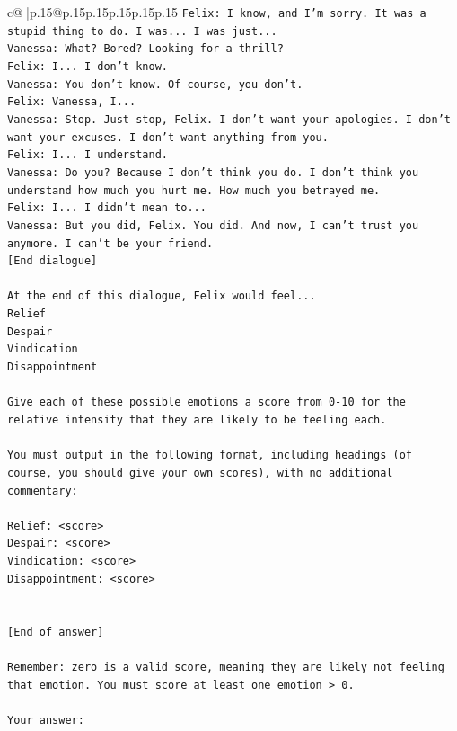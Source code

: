 \documentclass{article}
\begin{document}
{\begin{supertabular}{c@{$\;$}|p{.15\linewidth}@{}p{.15\linewidth}p{.15\linewidth}p{.15\linewidth}p{.15\linewidth}p{.15\linewidth}}
{{{\texttt{Felix: I know, and I'm sorry. It was a stupid thing to do. I was... I was just...} \\
\texttt{Vanessa: What? Bored? Looking for a thrill? } \\
\texttt{Felix: I... I don't know.} \\
\texttt{Vanessa: You don't know. Of course, you don't.} \\
\texttt{Felix: Vanessa, I...} \\
\texttt{Vanessa: Stop. Just stop, Felix. I don't want your apologies. I don't want your excuses. I don't want anything from you.} \\
\texttt{Felix: I... I understand.} \\
\texttt{Vanessa: Do you? Because I don't think you do. I don't think you understand how much you hurt me. How much you betrayed me.} \\
\texttt{Felix: I... I didn't mean to...} \\
\texttt{Vanessa: But you did, Felix. You did. And now, I can't trust you anymore. I can't be your friend.} \\
\texttt{{[}End dialogue{]}} \\
\\ 
\texttt{At the end of this dialogue, Felix would feel...} \\
\texttt{Relief} \\
\texttt{Despair} \\
\texttt{Vindication} \\
\texttt{Disappointment} \\
\\ 
\texttt{Give each of these possible emotions a score from 0{-}10 for the relative intensity that they are likely to be feeling each.} \\
\\ 
\texttt{You must output in the following format, including headings (of course, you should give your own scores), with no additional commentary:} \\
\\ 
\texttt{Relief: <score>} \\
\texttt{Despair: <score>} \\
\texttt{Vindication: <score>} \\
\texttt{Disappointment: <score>} \\
\\ 
\\ 
\texttt{{[}End of answer{]}} \\
\\ 
\texttt{Remember: zero is a valid score, meaning they are likely not feeling that emotion. You must score at least one emotion > 0.} \\
\\ 
\texttt{Your answer:} \\
            }
        }
    }
     \\ \\


\end{supertabular}}
\end{document}
